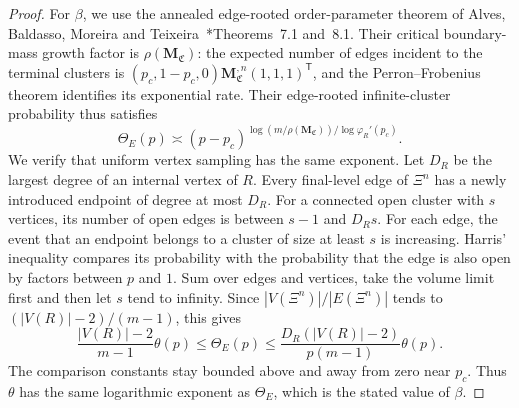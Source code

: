 \begin{proof}
For $\beta$, we use the annealed edge-rooted order-parameter theorem of Alves, Baldasso, Moreira and Teixeira~\cite{alves2026percolation}*{Theorems~7.1 and~8.1}.
Their critical boundary-mass growth factor is $\rho(\mathbf M_{\mathfrak C})$: the expected number of edges incident to the terminal clusters is
$(p_c,1-p_c,0)\mathbf M_{\mathfrak C}^{,n}(1,1,1)^{\mathsf T}$,
and the Perron--Frobenius theorem identifies its exponential rate.
Their edge-rooted infinite-cluster probability thus satisfies
\[
 \Theta_E(p)\asymp
 (p-p_c)^{\log(m/\rho(\mathbf M_{\mathfrak C}))/\log\varphi_R'(p_c)}.
\]
We verify that uniform vertex sampling has the same exponent.
Let $D_R$ be the largest degree of an internal vertex of $R$.
Every final-level edge of $\Xi^n$ has a newly introduced endpoint of degree at most $D_R$.
For a connected open cluster with $s$ vertices, its number of open edges is between $s-1$ and $D_Rs$.
For each edge, the event that an endpoint belongs to a cluster of size at least $s$ is increasing.
Harris' inequality compares its probability with the probability that the edge is also open by factors between $p$ and $1$.
Sum over edges and vertices, take the volume limit first and then let $s$ tend to infinity.
Since $|V(\Xi^n)|/|E(\Xi^n)|$ tends to $(|V(R)|-2)/(m-1)$, this gives
\[
 \frac{|V(R)|-2}{m-1}\theta(p)
 \le\Theta_E(p)
 \le\frac{D_R(|V(R)|-2)}{p(m-1)}\theta(p).
\]
The comparison constants stay bounded above and away from zero near $p_c$.
Thus $\theta$ has the same logarithmic exponent as $\Theta_E$, which is the stated value of $\beta$.
\end{proof}

